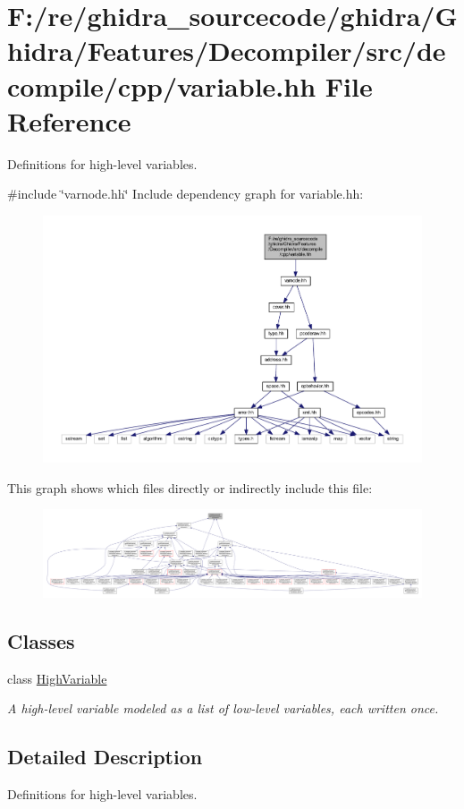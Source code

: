 \hypertarget{variable_8hh}{}\section{F\+:/re/ghidra\+\_\+sourcecode/ghidra/\+Ghidra/\+Features/\+Decompiler/src/decompile/cpp/variable.hh File Reference}
\label{variable_8hh}


Definitions for high-\/level variables.  


{\ttfamily \#include \char`\"{}varnode.\+hh\char`\"{}}\newline
Include dependency graph for variable.\+hh\+:
\nopagebreak
\begin{figure}[H]
\begin{center}
\leavevmode
\includegraphics[width=350pt]{variable_8hh__incl}
\end{center}
\end{figure}
This graph shows which files directly or indirectly include this file\+:
\nopagebreak
\begin{figure}[H]
\begin{center}
\leavevmode
\includegraphics[width=350pt]{variable_8hh__dep__incl}
\end{center}
\end{figure}
\subsection*{Classes}
\begin{DoxyCompactItemize}
\item 
class \mbox{\hyperlink{class_high_variable}{High\+Variable}}
\begin{DoxyCompactList}\small\item\em A high-\/level variable modeled as a list of low-\/level variables, each written once. \end{DoxyCompactList}\end{DoxyCompactItemize}


\subsection{Detailed Description}
Definitions for high-\/level variables. 

